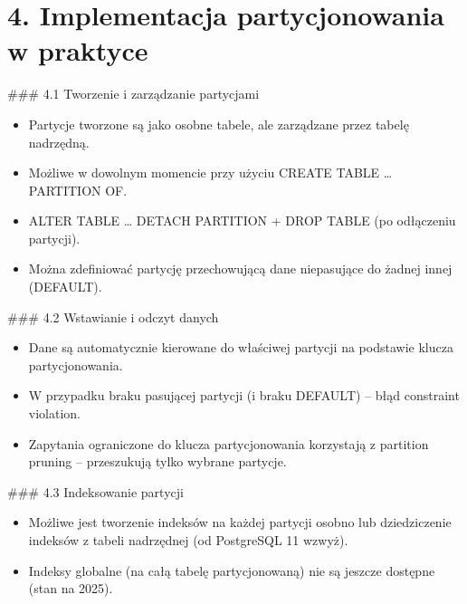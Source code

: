 \documentclass[a4paper,11pt,polish]{sphinxmanual}
\begin{document}
\section{4. Implementacja partycjonowania w praktyce}
\label{\detokenize{rozdzial_1:implementacja-partycjonowania-w-praktyce}}
\sphinxAtStartPar
\#\#\# 4.1 Tworzenie i zarządzanie partycjami
\begin{itemize}
\item {} 
\sphinxAtStartPar
{} Partycje tworzone są jako osobne tabele, ale zarządzane przez tabelę nadrzędną.

\item {} 
\sphinxAtStartPar
{} Możliwe w dowolnym momencie przy użyciu CREATE TABLE … PARTITION OF.

\item {} 
\sphinxAtStartPar
{} ALTER TABLE … DETACH PARTITION + DROP TABLE (po odłączeniu partycji).

\item {} 
\sphinxAtStartPar
{} Można zdefiniować partycję przechowującą dane niepasujące do żadnej innej (DEFAULT).

\end{itemize}

\sphinxAtStartPar
\#\#\# 4.2 Wstawianie i odczyt danych
\begin{itemize}
\item {} 
\sphinxAtStartPar
Dane są automatycznie kierowane do właściwej partycji na podstawie klucza partycjonowania.

\item {} 
\sphinxAtStartPar
W przypadku braku pasującej partycji (i braku DEFAULT) – błąd constraint violation.

\item {} 
\sphinxAtStartPar
Zapytania ograniczone do klucza partycjonowania korzystają z partition pruning – przeszukują tylko wybrane partycje.

\end{itemize}

\sphinxAtStartPar
\#\#\# 4.3 Indeksowanie partycji
\begin{itemize}
\item {} 
\sphinxAtStartPar
Możliwe jest tworzenie indeksów na każdej partycji osobno lub dziedziczenie indeksów z tabeli nadrzędnej (od PostgreSQL 11 wzwyż).

\item {} 
\sphinxAtStartPar
Indeksy globalne (na całą tabelę partycjonowaną) nie są jeszcze dostępne (stan na 2025).

\end{itemize}
\end{document}
